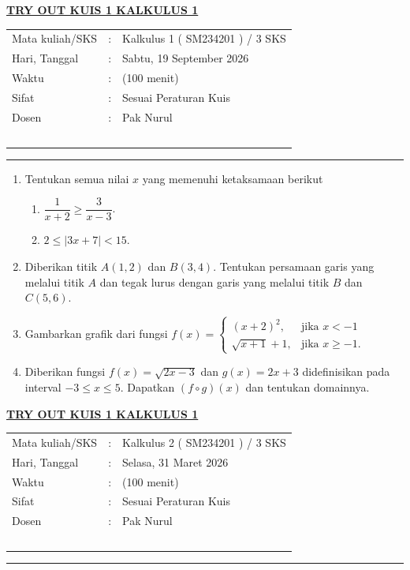 \documentclass[10pt,openany,a4paper]{article}
\theoremstyle{definition}
\theoremstyle{definition}
\theoremstyle{plain}
\begin{document}
    \begin{center}
	{\underline{\textbf{\MakeUppercase{Try Out KUIS 1 Kalkulus 1}}}}
    \end{center}

    \begin{center}
	\begin{tabular}{lcl}
		Mata kuliah/SKS & : & Kalkulus 1 ( SM234201 ) / 3 SKS\\
		Hari, Tanggal & : & Sabtu, 19 September 2026\\
		Waktu & : & (100 menit)\\
		Sifat & : & Sesuai Peraturan Kuis\\
        Dosen & : & Pak Nurul\\
  ~
	\end{tabular}
    
    \noindent\rule{\textwidth}{2.pt}
        \end{center}
\begin{enumerate}
    \item Tentukan semua nilai $x$ yang memenuhi ketaksamaan berikut
    \begin{enumerate}
    \item $\dfrac{1}{x+2}\geq \dfrac{3}{x-3}$.
    \item $2\leq |3x+7|<15$.
    \end{enumerate}
    \item Diberikan titik $A(1,2)$ dan $B(3,4)$. Tentukan persamaan garis yang melalui titik $A$ dan tegak lurus dengan garis yang melalui titik $B$ dan $C(5,6)$.
    \item Gambarkan grafik dari fungsi $f(x)=\begin{cases}
    (x+2)^2, & \text{jika } x<-1\\
    \sqrt{x+1}+1, & \text{jika } x\geq -1.
    \end{cases}$
    \item Diberikan fungsi $f(x)=\sqrt{2x-3}$ dan $g(x)=2x+3$ didefinisikan pada interval $-3\leq x\leq 5$. Dapatkan $(f\circ g)(x)$ dan tentukan domainnya.
\end{enumerate}
\newpage 
{}
 \begin{center}
    {\underline{\textbf{\MakeUppercase{Try Out KUIS 1 KALKULUS 1}}}}
    \end{center}
    \begin{center}
	\begin{tabular}{lcl}
		Mata kuliah/SKS & : & Kalkulus 2 ( SM234201 ) / 3 SKS\\
		Hari, Tanggal & : & Selasa, 31 Maret 2026\\
		Waktu & : & (100 menit)\\
		Sifat & : & Sesuai Peraturan Kuis\\
        Dosen & : & Pak Nurul\\
  ~
	\end{tabular}
    
    \noindent\rule{\textwidth}{2.pt}
        \end{center}
\end{document}
